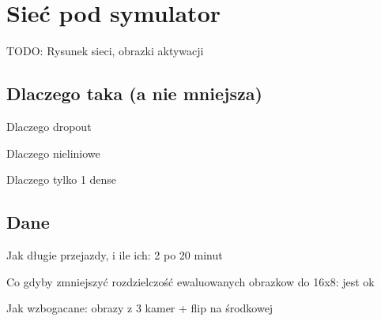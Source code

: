\chapter{Sieć pod symulator}
TODO: Rysunek sieci, obrazki aktywacji

\section{Dlaczego taka (a nie mniejsza)}
Dlaczego dropout

Dlaczego nieliniowe

Dlaczego tylko 1 dense

\section{Dane}
Jak długie przejazdy, i ile ich: 2 po 20 minut

Co gdyby zmniejszyć rozdzielczość ewaluowanych obrazkow do 16x8: jest ok

Jak wzbogacane: obrazy z 3 kamer + flip na środkowej

